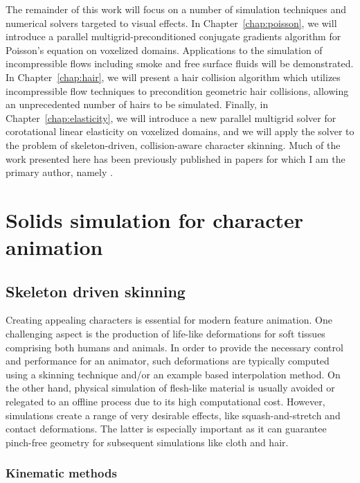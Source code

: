 The remainder of this work will focus on a number of simulation
techniques and numerical solvers targeted to visual effects.  In
Chapter~\ref{chap:poisson}, we will introduce a parallel
multigrid-preconditioned conjugate gradients algorithm for Poisson's
equation on voxelized domains. Applications to the simulation of
incompressible flows including smoke and free surface fluids will be
demonstrated.  In Chapter~\ref{chap:hair}, we will
present a hair collision algorithm which utilizes incompressible flow
techniques to precondition geometric hair collisions, allowing an
unprecedented number of hairs to be simulated.  Finally, in
Chapter~\ref{chap:elasticity}, we will introduce a new parallel multigrid
solver for corotational linear elasticity on voxelized domains, and we
will apply the solver to the problem of skeleton-driven,
collision-aware character skinning.  Much of the work presented here
has been previously published in papers for which I am the primary
author, namely \cite{mcadams:2009:hair,mcadams:2010:mgpcg}.


\section{Solids simulation for character animation}

	\subsection{Skeleton driven skinning}
	Creating appealing characters is essential for modern feature animation. One challenging aspect is the production of life-like deformations for soft tissues comprising both humans and animals. In order to provide the necessary control and performance for an animator, such deformations are typically computed using a skinning technique and/or an example based interpolation method. On the other hand, physical simulation of flesh-like material is usually avoided or relegated to an offline process due to its high computational cost. However, simulations create a range of very desirable effects, like squash-and-stretch and contact deformations. The latter is especially important as it can guarantee pinch-free geometry for subsequent simulations like cloth and hair. 
		\subsubsection{Kinematic methods}
		
